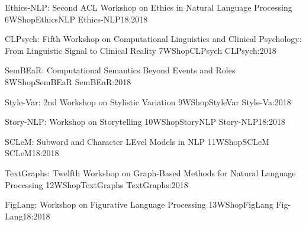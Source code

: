  \begin{wsschedule}
   {Ethics-NLP: Second ACL Workshop on Ethics in Natural Language Processing}
   {6}{WShopEthicsNLP}
   {Ethics-NLP18:2018}
   {\WShopLocG}
   
 \end{wsschedule}


\begin{wsschedule}
  {CLPsych: Fifth Workshop on Computational Linguistics and Clinical Psychology: From Linguistic Signal to Clinical Reality}
  {7}{WShopCLPsych}
  {CLPsych:2018}
  {\WShopLocZ}
  
\end{wsschedule}

\begin{wsschedule}
  {SemBEaR: Computational Semantics Beyond Events and Roles}
  {8}{WShopSemBEaR}
  {SemBEaR:2018}
  {\WShopLocG}
  
\end{wsschedule}

\begin{wsschedule}
  {Style-Var: 2nd Workshop on Stylistic Variation}
  {9}{WShopStyleVar}
  {Style-Va:2018}
  {\WShopLocH}
  
\end{wsschedule}

\begin{wsschedule}
  {Story-NLP: Workshop on Storytelling}
  {10}{WShopStoryNLP}
  {Story-NLP18:2018}
  {\WShopLocI}
  
\end{wsschedule}



\begin{wsschedule}
  {SCLeM: Subword and Character LEvel Models in NLP}
  {11}{WShopSCLeM}
  {SCLeM18:2018}
  {\WShopLocK}
  
\end{wsschedule}

  \begin{wsschedule}
   {TextGraphs: Twelfth Workshop on Graph-Based Methods for Natural Language Processing}
   {12}{WShopTextGraphs}
   {TextGraphs:2018}
   {\WShopLocP}
   
 \end{wsschedule}
 
  \begin{wsschedule}
   {FigLang: Workshop on Figurative Language Processing}
   {13}{WShopFigLang}
   {Fig-Lang18:2018}
   {\WShopLocP}
   
 \end{wsschedule}

